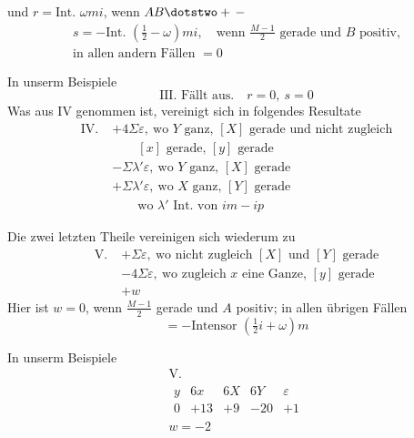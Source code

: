 und $r=\text{Int. }\omega mi$, wenn $AB\dotstwo+\,-$
\[
\begin{gathered}
s=-\text{Int. }(\tfrac12-\omega)mi,\quad\text{wenn }\frac{M-1}{2}\text{ gerade und }B\text{ positiv,}\\
\text{in allen andern Fällen }=0
\end{gathered}
\]

In unserm Beispiele
\[
\text{III. Fällt aus.}\quad r=0,\ s=0
\]
Was aus IV genommen ist, vereinigt sich in folgendes Resultate
\[
\begin{aligned}
\mathrm{IV.}\;&+4\Sigma\varepsilon,\ \text{wo }Y\text{ ganz, }[X]\text{ gerade und nicht zugleich}\\
&\qquad[x]\text{ gerade, }[y]\text{ gerade}\\
&-\Sigma\lambda'\varepsilon,\ \text{wo }Y\text{ ganz, }[X]\text{ gerade}\\
&+\Sigma\lambda'\varepsilon,\ \text{wo }X\text{ ganz, }[Y]\text{ gerade}\\
&\qquad\text{wo }\lambda'\text{ Int. von }im-ip
\end{aligned}
\]

Die zwei letzten Theile vereinigen sich wiederum zu
\[
\begin{aligned}
\mathrm{V.}\;&+\Sigma\varepsilon,\ \text{wo nicht zugleich }[X]\text{ und }[Y]\text{ gerade}\\
&-4\Sigma\varepsilon,\ \text{wo zugleich }x\text{ eine Ganze, }[y]\text{ gerade}\\
&+w
\end{aligned}
\]
Hier ist $w=0$, wenn $\frac{M-1}{2}$ gerade und $A$ positiv; in allen übrigen Fällen
\[
=-\text{Intensor }(\tfrac12i+\omega)m
\]

In unserm Beispiele
\[
\begin{gathered}
\mathrm{V.}\\
\begin{array}{c|r|r|r|r}
y&6x&6X&6Y&\varepsilon\\
0&+13&+9&-20&+1
\end{array}\\
w=-2
\end{gathered}
\]

